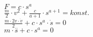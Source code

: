 \documentclass[11pt,a4paper]{article}
\begin{document}
$F=c\cdot s^a$
\vspace*{20pt}\\
$\frac{m}{2}\cdot v^2+\frac{c}{a+1}\cdot s^{a+1}=konst.$
\vspace*{20pt}\\
$\frac{m\cdot 2v\cdot\dot v}{2}+c\cdot s^a\cdot\dot s=0$
\vspace*{20pt}\\
$m\cdot \overset{\textbf{..}}s+c\cdot s^a=0$
\end{document}
